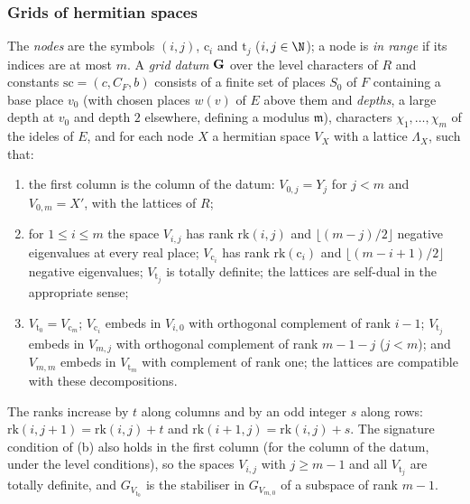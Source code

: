 \subsubsection{Grids of hermitian spaces}
\begin{definition}[Grids]\label{def:pf:rowprops:grid}
The \emph{nodes} are the symbols $(i,j)$, $\mathrm c_i$ and $\mathrm t_j$ ($i,j\in\N$); a node is \emph{in range} if its
indices are at most $m$. A \emph{grid datum} $\mathbf{G}$ over the level characters of $R$ and constants
$\mathrm{sc}=(c,C_F,b)$ consists of a finite set of places $S_0$ of $F$ containing a base place $v_0$ (with chosen
places $w(v)$ of $E$ above them and \emph{depths}, a large depth at $v_0$ and depth $2$ elsewhere, defining a modulus
$\mathfrak m$), characters $\chi_1,\dots,\chi_m$ of the ideles of $E$, and for each node $X$ a hermitian space $V_X$
with a lattice $\Lambda_X$, such that:
\begin{enumerate}[label=(\alph*)]
\item the first column is the column of the datum: $V_{0,j}=Y_j$ for $j<m$ and $V_{0,m}=X'$, with the lattices of $R$;
\item for $1\le i\le m$ the space $V_{i,j}$ has rank $\mathrm{rk}(i,j)$ and $\lfloor (m-j)/2\rfloor$ negative eigenvalues
at every real place; $V_{\mathrm c_i}$ has rank $\mathrm{rk}(\mathrm c_i)$ and $\lfloor(m-i+1)/2\rfloor$ negative
eigenvalues; $V_{\mathrm t_j}$ is totally definite; the lattices are self-dual in the appropriate sense;
\item $V_{\mathrm t_0}=V_{\mathrm c_m}$; $V_{\mathrm c_i}$ embeds in $V_{i,0}$ with orthogonal complement of rank $i-1$;
$V_{\mathrm t_j}$ embeds in $V_{m,j}$ with orthogonal complement of rank $m-1-j$ ($j<m$); and $V_{m,m}$ embeds in
$V_{\mathrm t_m}$ with complement of rank one; the lattices are compatible with these decompositions.
\end{enumerate}
The ranks increase by $t$ along columns and by an odd integer $s$ along rows: $\mathrm{rk}(i,j+1)=\mathrm{rk}(i,j)+t$ and
$\mathrm{rk}(i+1,j)=\mathrm{rk}(i,j)+s$. The signature condition of (b) also holds in the first column (for the column
of the datum, under the level conditions), so the spaces $V_{i,j}$ with $j\ge m-1$ and all $V_{\mathrm t_j}$ are totally
definite, and $G_{V_{\mathrm t_0}}$ is the stabiliser in $G_{V_{m,0}}$ of a subspace of rank $m-1$.
\end{definition}

